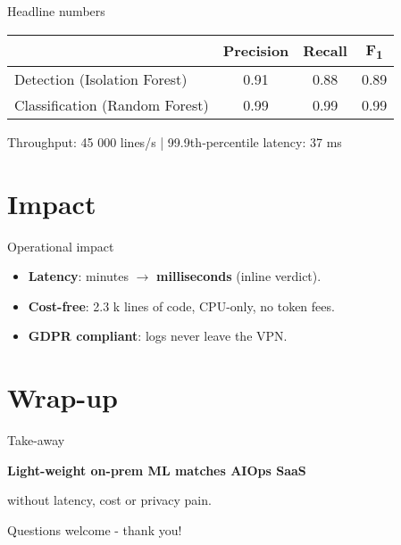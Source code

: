 \documentclass[15pt,aspectratio=169]{beamer}
\newcommand{\IForest}{Isolation Forest\xspace}
\newcommand{\RForest}{Random Forest\xspace}
\newcommand{\LOC}{lines of code\xspace}
\begin{document}

\begin{frame}{Headline numbers}
\centering
\begin{tabular}{lccc}
  \toprule
   & Precision & Recall & F\textsubscript{1} \\
  \midrule
  Detection (\IForest) & 0.91 & 0.88 & 0.89 \\
  Classification (\RForest) & 0.99 & 0.99 & 0.99 \\
  \bottomrule
\end{tabular}

\vspace{.8em}
\small
Throughput: 45 000 lines/s \;|\; 99.9th‑percentile latency: 37 ms
\end{frame}

\section{Impact}

\begin{frame}{Operational impact}
\begin{itemize}[<+->]
  \item \textbf{Latency}: minutes $\rightarrow$ \textbf{milliseconds} (inline verdict).
  \item \textbf{Cost-free}: 2.3 k \LOC{}, CPU-only, no token fees.
  \item \textbf{GDPR compliant}: logs never leave the VPN.
\end{itemize}
\end{frame}

\section{Wrap-up}

\begin{frame}{Take-away}
\vspace{2em}
\centering
{\Large
  \textbf{Light-weight on-prem ML matches AIOps SaaS}\par
  \vspace{.4em}
  without latency, cost or privacy pain.
}

\vspace{2.2em}
\small
Questions welcome - thank you!
\end{frame}
\end{document}
